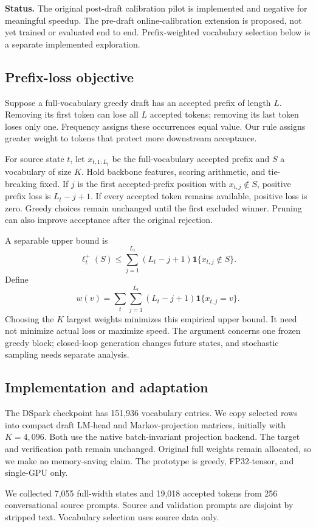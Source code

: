 \documentclass[10pt]{article}
\begin{document}
\textbf{Status.} The original post-draft calibration pilot is implemented and negative for meaningful speedup. The pre-draft online-calibration extension is proposed, not yet trained or evaluated end to end. Prefix-weighted vocabulary selection below is a separate implemented exploration.

\subsection{Prefix-loss objective}
Suppose a full-vocabulary greedy draft has an accepted prefix of length $L$. Removing its first token can lose all $L$ accepted tokens; removing its last token loses only one. Frequency assigns these occurrences equal value. Our rule assigns greater weight to tokens that protect more downstream acceptance.

For source state $t$, let $x_{t,1:L_t}$ be the full-vocabulary accepted prefix and $S$ a vocabulary of size $K$. Hold backbone features, scoring arithmetic, and tie-breaking fixed. If $j$ is the first accepted-prefix position with $x_{t,j}\notin S$, positive prefix loss is $L_t-j+1$. If every accepted token remains available, positive loss is zero. Greedy choices remain unchanged until the first excluded winner. Pruning can also improve acceptance after the original rejection.

A separable upper bound is
\[
 \ell_t^+(S)\leq\sum_{j=1}^{L_t}(L_t-j+1)\mathbf{1}\{x_{t,j}\notin S\}.
\]
Define
\[
 w(v)=\sum_t\sum_{j=1}^{L_t}(L_t-j+1)\mathbf{1}\{x_{t,j}=v\}.
\]
Choosing the $K$ largest weights minimizes this empirical upper bound. It need not minimize actual loss or maximize speed. The argument concerns one frozen greedy block; closed-loop generation changes future states, and stochastic sampling needs separate analysis.
\subsection{Implementation and adaptation}
The DSpark checkpoint has 151,936 vocabulary entries. We copy selected rows into compact draft LM-head and Markov-projection matrices, initially with $K=4,096$. Both use the native batch-invariant projection backend. The target and verification path remain unchanged. Original full weights remain allocated, so we make no memory-saving claim. The prototype is greedy, FP32-tensor, and single-GPU only.

We collected 7,055 full-width states and 19,018 accepted tokens from 256 conversational source prompts. Source and validation prompts are disjoint by stripped text. Vocabulary selection uses source data only.
\end{document}
